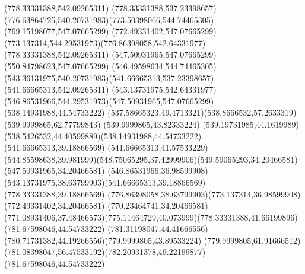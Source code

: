 {{\closepath
\moveto(778.33331388,542.09265311)
\lineto(778.33331388,537.23398657)
\curveto(776.63864725,540.20731983)(773.50398066,544.74465305)(769.15198077,547.07665299)
\lineto(772.49331402,547.07665299)
\curveto(773.137314,544.29531973)(776.86398058,542.64331977)(778.33331388,542.09265311)
\moveto(547.50931965,547.07665299)
\lineto(550.84798623,547.07665299)
\curveto(546.49598634,544.74465305)(543.36131975,540.20731983)(541.66665313,537.23398657)
\lineto(541.66665313,542.09265311)
\curveto(543.13731975,542.64331977)(546.86531966,544.29531973)(547.50931965,547.07665299)
\moveto(538.14931988,44.54733222)
\curveto(537.58665323,49.4713321)(538.8666532,57.2633319)(539.9999865,62.77799843)
\lineto(539.9999865,43.82333224)
\curveto(539.19731985,44.1619989)(538.5426532,44.40599889)(538.14931988,44.54733222)
\moveto(541.66665313,39.18866569)
\lineto(541.66665313,41.57533229)
\curveto(544.85598638,39.981999)(548.75065295,37.42999906)(549.59065293,34.20466581)
\lineto(547.50931965,34.20466581)
\curveto(546.86531966,36.98599908)(543.13731975,38.63799903)(541.66665313,39.18866569)
\moveto(778.33331388,39.18866569)
\curveto(776.86398058,38.63799903)(773.137314,36.98599908)(772.49331402,34.20466581)
\lineto(770.23464741,34.20466581)
\curveto(771.08931406,37.48466573)(775.11464729,40.073999)(778.33331388,41.66199896)
\closepath
\moveto(781.67598046,44.54733222)
\curveto(781.31198047,44.41666556)(780.71731382,44.19266556)(779.9999805,43.89533224)
\lineto(779.9999805,61.91666512)
\curveto(781.08398047,56.47533192)(782.20931378,49.22199877)(781.67598046,44.54733222)
}
}
